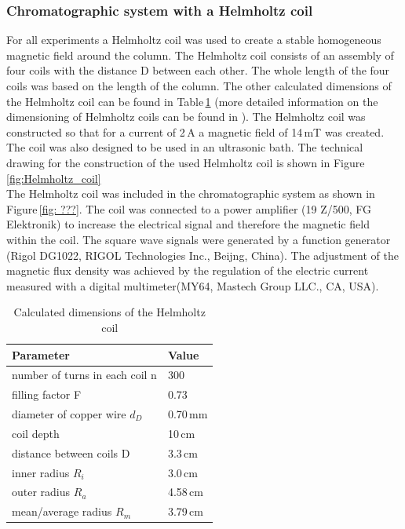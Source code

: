 \subsubsection{Chromatographic system with a Helmholtz coil}
\label{subsubsec:helm_coil}
For all experiments a Helmholtz coil was used to create a stable homogeneous magnetic field around the column. The Helmholtz coil consists of an assembly of four coils with the distance D between each other. The whole length of the four coils was based on the length of the column. The other calculated dimensions of the Helmholtz coil can be found in Table\,\ref{table:Helmholtz_coil} (more detailed information on the dimensioning of Helmholtz coils can be found in \cite{wotruba1968verbesserung,wotruba1969massive,heller1955erzeugung}). The Helmholtz coil was constructed so that for a current of 2\,A a magnetic field of 14\,mT was created. The coil was also designed to be used in an ultrasonic bath. The technical drawing for the construction of the used Helmholtz coil is shown in Figure\,\ref{fig:Helmholtz_coil}\\  
The Helmholtz coil was included in the chromatographic system as shown in Figure\,\ref{fig: ???}. The coil was connected to a power amplifier (19 Z/500, FG Elektronik) to increase the electrical signal and therefore the magnetic field within the coil. The square wave signals were generated by a function generator (Rigol DG1022, RIGOL Technologies Inc., Beijng, China). The adjustment of the magnetic flux density was achieved by the regulation of the electric current measured with a digital multimeter(MY64, Mastech Group LLC., CA, USA).   

\begin{table}[H]
\centering
\caption[Dimensions of the Helmholtz coil]{Calculated dimensions of the Helmholtz coil}
\label{table:Helmholtz_coil}
\begin{tabular}{ll}\hline
Parameter &  Value \\
\hline\hline
 number of turns in each coil n & 300 \\
 filling factor F & 0.73\\
 diameter of copper wire $d_{D}$ & 0.70\,mm\\
 coil depth & 10\,cm\\
 distance between coils D & 3.3\,cm \\
 inner radius $R_{i}$ & 3.0\,cm\\ 
 outer radius $R_{a}$ & 4.58\,cm\\
 mean/average radius $R_{m}$ & 3.79\,cm\\
 \hline
\end{tabular}
\end{table}


